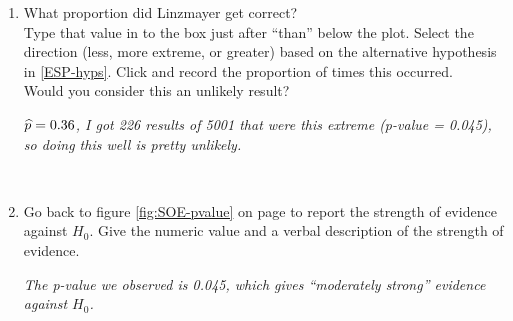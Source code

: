 \begin{enumerate}
     \item What proportion did Linzmayer get correct? \\
           Type that value in to the box just after ``than'' below the
           plot.  Select the direction (less, more extreme, or greater)
           based on the alternative hypothesis in
           \ref{ESP-hyps}. Click  and record the proportion of
           times this occurred.\\  
           Would you consider this an unlikely result?
\begin{students}
  \vspace{1.2cm}
\end{students}
\begin{key}
{\it $\widehat{p} = 0.36$, I got 226 results of 5001 that
  were this extreme (p-value = 0.045), so doing this well is pretty unlikely.}
\end{key}
\\

     \item  Go back to figure \ref{fig:SOE-pvalue} on page
       \pageref{fig:SOE-pvalue}  to report the
       strength of evidence against $H_0$.  Give the numeric value and a
       verbal description of the strength of evidence.  
\begin{students}
  \vspace{1cm}
\end{students}
\begin{key}
{\it The p-value we observed is 0.045, which gives ``moderately
  strong'' evidence against $H_0$. }
\end{key}
\\
\end{enumerate}





